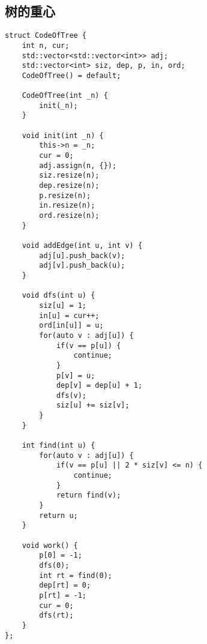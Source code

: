 \subsection{树的重心}
\begin{lstlisting}
struct CodeOfTree {
    int n, cur;
    std::vector<std::vector<int>> adj;
    std::vector<int> siz, dep, p, in, ord;
    CodeOfTree() = default;

    CodeOfTree(int _n) {
        init(_n);
    }

    void init(int _n) {
        this->n = _n;
        cur = 0;
        adj.assign(n, {});
        siz.resize(n);
        dep.resize(n);
        p.resize(n);
        in.resize(n);
        ord.resize(n);
    }

    void addEdge(int u, int v) {
        adj[u].push_back(v);
        adj[v].push_back(u);
    }

    void dfs(int u) {
        siz[u] = 1;
        in[u] = cur++;
        ord[in[u]] = u;
        for(auto v : adj[u]) {
            if(v == p[u]) {
                continue;
            }
            p[v] = u;
            dep[v] = dep[u] + 1;
            dfs(v);
            siz[u] += siz[v];
        }
    }

    int find(int u) {
        for(auto v : adj[u]) {
            if(v == p[u] || 2 * siz[v] <= n) {
                continue;
            }
            return find(v);
        }
        return u;
    }

    void work() {
        p[0] = -1;
        dfs(0);
        int rt = find(0);
        dep[rt] = 0;
        p[rt] = -1;
        cur = 0;
        dfs(rt);
    }
};
\end{lstlisting}

